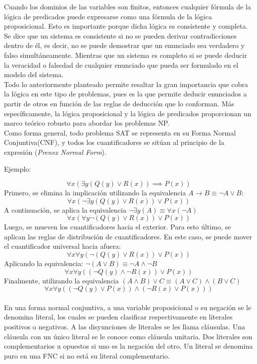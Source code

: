 \documentclass[12pt]{report}
\begin{document}
Cuando los dominios de las variables son finitos, entonces cualquier fórmula de la lógica de predicados puede expresarse como una fórmula de la lógica proposicional. Esto es importante porque dicha lógica es consistente y completa. Se dice que un sistema es consistente si no se pueden derivar contradicciones dentro de él, es decir, no se puede demostrar que un enunciado sea verdadero y falso simultáneamente. Mientras que un sistema es completo si se puede deducir la veracidad o falsedad de cualquier enunciado que pueda ser formulado en el modelo del sistema. \\

Todo lo anteriormente planteado permite resaltar la gran importancia que cobra la lógica en este tipo de problemas, pues es la que permite deducir enunciados a partir de otros en función de las reglas de deducción que lo conforman. Más específicamente, la lógica proposicional y la lógica de predicados proporcionan un marco teórico robusto para abordar los problemas NP.\\


Como forma general, todo problema SAT se representa en su Forma Normal Conjuntiva(CNF), y todos los cuantificadores se sitúan al principio de la expresión (\textit{Prenex Normal Form}).

Ejemplo:

$$\forall x(\exists y(Q(y)\lor R(x))\implies P(x))$$
Primero, se elimina la implicación utilizando la equivalencia $A→B\equiv \neg A\lor B$:
$$\forall x(\neg\exists y(Q(y)\lor R(x)) \lor  P(x))$$
A continuación, se aplica la equivalencia $\neg\exists y(A)\equiv \forall x(\neg A)$
$$\forall x(\forall y\neg(Q(y)\lor R(x)) \lor  P(x))$$
Luego, se mueven los cuantificadores hacia el exterior. Para esto último, se aplican las reglas de distribución de cuantificadores. En este caso, se puede mover el cuantificador universal hacia afuera:
$$\forall x\forall y(\neg(Q(y)\lor R(x))\lor  P(x))$$
Aplicando la equivalencia: $\neg(A\lor B)\equiv \neg A\land\neg B$
$$\forall x\forall y((\neg Q(y)\land\neg R(x))\lor  P(x))$$
Finalmente, utilizando la equivalencia $(A\land B)\lor C\equiv (A\lor C)\land(B\lor C)$
$$\forall x\forall y((\neg Q(y)\lor  P(x))\land(\neg R(x)\lor  P(x)))$$\\

En una forma normal conjuntiva, a una variable proposicional o su negación se le denomina literal, los cuales se pueden clasificar respectivamente en literales positivos o negativos. A las disyunciones de literales se les llama cláusulas. Una cláusula con un único literal se le conoce como cláusula unitaria. Dos literales son complementarios u opuestos si uno es la negación del otro. Un literal se denomina puro en una FNC si no está su literal complementario.
\end{document}
